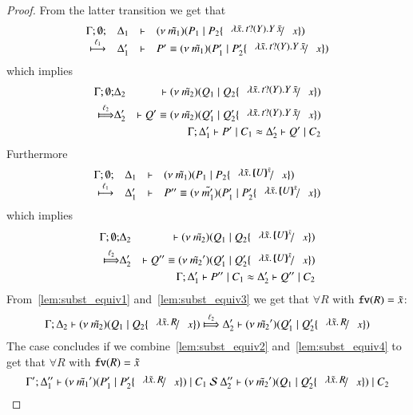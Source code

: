 \begin{proof}
	\noi From the latter transition we get that
%
\[
		\mhorel{\Gamma}{\Delta_1}{\newsp{\tilde{m_1}}{P_1 \Par P_2 \subst{\abs{\tilde{x}}{\binp{t}{Y} \appl{Y}{\tilde{x}}}}{x}}}
		{\hby{\ell_1}}{\Delta_1'}{P' \scong}{\newsp{\tilde{m_1}}{P_1' \Par P_2' \subst{\abs{\tilde{x}}{\binp{t}{Y} \appl{Y}{\tilde{x}}}}{x}}}
\]
%
	\noi which implies
%
	\begin{eqnarray}
		\Gamma; \es; &\Delta_2& \proves \newsp{\tilde{m_2}}{Q_1 \Par Q_2 \subst{\abs{\tilde{x}}{\binp{t}{Y} \appl{Y}{\tilde{x}}}}{x}} \nonumber \\
		\Hby{\ell_2}&
		\Delta_2'& \proves Q' \scong \newsp{\tilde{m_2}}{Q_1' \Par Q_2' \subst{\abs{\tilde{x}}{\binp{t}{Y} \appl{Y}{\tilde{x}}}}{x}}
		\label{lem:subst_equiv1}
		\\
		&&\horel{\Gamma}{\Delta_1'}{P' \Par C_1}{\wb}{\Delta_2'}{Q' \Par C_2} \label{lem:subst_equiv2}
	\end{eqnarray}
%
	\noi Furthermore
%
\[
	\mhorel{\Gamma}{\Delta_1}{\newsp{\tilde{m_1}}{P_1 \Par P_2 \subst{\abs{\tilde{x}}{\mapchar{U}{\tilde{x}}}}{x}}}{\hby{\ell_1}}
	{\Delta_1'}{P'' \scong}{\newsp{\tilde{m_1'}}{P_1' \Par P_2' \subst{\abs{\tilde{x}}{\mapchar{U}{\tilde{x}}}}{x}}}
\]
%
	\noi which implies
%
	\begin{eqnarray}
		\Gamma; \es; &\Delta_2& \proves \newsp{\tilde{m_2}}{Q_1 \Par Q_2 \subst{\abs{\tilde{x}}{\mapchar{U}{\tilde{x}}}}{x}} \nonumber \\
		\Hby{\ell_2} &\Delta_2'& \proves  Q'' \scong \newsp{\tilde{m_2}'}{Q_1' \Par Q_2' \subst{\abs{\tilde{x}}{\mapchar{U}{\tilde{x}}}}{x}}
		\label{lem:subst_equiv3}
		\\
		&&\horel{\Gamma}{\Delta_1'}{P'' \Par C_1}{\wb}{\Delta_2'}{Q'' \Par C_2} \label{lem:subst_equiv4}
	\end{eqnarray}
%
	\noi From~\ref{lem:subst_equiv1} and~\ref{lem:subst_equiv3} we get that $\forall R$ with $\mathtt{fv}(R) = \tilde{x}$:
%
	\[
		\horel{\Gamma}{\Delta_2}{\newsp{\tilde{m_2}}{Q_1 \Par Q_2 \subst{\abs{\tilde{x}}{R}}{x}}}
		{\Hby{\ell_2}}
		{\Delta_2'}{\newsp{\tilde{m_2}'}{Q_1' \Par Q_2' \subst{\abs{\tilde{x}}{R}}{x}}}
	\]
%
	\noi The case concludes if we combine~\ref{lem:subst_equiv2} and~\ref{lem:subst_equiv4} to get that $\forall R$ with $\mathtt{fv}(R) = \tilde{x}$
%
	\[
		\horel{\Gamma'}{\Delta_1''}{\newsp{\tilde{m_1}'}{P_1' \Par P_2' \subst{\abs{\tilde{x}}{R}}{x}} \Par C_1}
		{\ \mathcal{S}\ }
		{\Delta_2''}{\newsp{\tilde{m_2}'}{Q_1 \Par Q_2' \subst{\abs{\tilde{x}}{R}}{x}} \Par C_2}
	\]



\end{proof}
